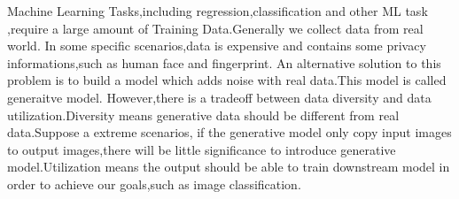 \documentclass[
    ngerman,american
    ]{scrartcl}
\newcommand{\lang}{en}
\begin{document}
        
        \sectionQuestions{\lang}
        
        \sectionQuestionsDescription{\lang}
        
        \begin{description}[style=unboxed]
            \item [\questionOne{\lang}] \vspace{\baselineskip}
                


                Machine Learning Tasks,including regression,classification and other ML task
                ,require a large amount of Training Data.Generally we collect data from real world.
                In some specific scenarios,data is expensive and contains some privacy informations,such as human face and fingerprint.
                An alternative solution to this problem is to build a model which adds noise with real data.This model is called generaitve model.
                However,there is a tradeoff between data diversity and data utilization.Diversity means generative data should be different from real data.Suppose a extreme scenarios,
                if the generative model only copy input images to output images,there will be little significance to introduce generative model.Utilization means the output should be able to  
                train downstream model in order to achieve our goals,such as image classification.


\end{description}
\end{document}
